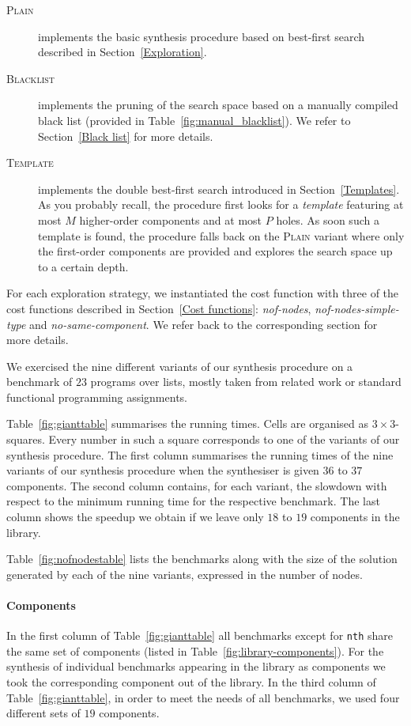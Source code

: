 \begin{description}
\item[\mdseries\textsc{Plain}] implements the basic synthesis procedure based on best-first search described in Section~\ref{Exploration}.
\item[\mdseries\textsc{Blacklist}] implements the pruning of the search space based on a manually compiled black list (provided in Table~\ref{fig:manual_blacklist}). We refer to Section~\ref{Black list} for more details.
\item[\mdseries\textsc{Template}] implements the double best-first search introduced in Section~\ref{Templates}. As you probably recall, the procedure first looks for a \emph{template} featuring at most $M$ higher-order components and at most $P$ holes. As soon such a template is found, the procedure falls back on the \textsc{Plain} variant where only the first-order components are provided and explores the search space up to a certain depth.
\end{description}

For each exploration strategy, we instantiated the cost function with three of the cost functions described in Section~\ref{Cost functions}: \textit{nof-nodes}, \textit{nof-nodes-simple-type} and \textit{no-same-component}. We refer back to the corresponding section for more details.

We exercised the nine different variants of our synthesis procedure on a benchmark of $23$ programs over lists, mostly taken from related work or standard functional programming assignments.

Table~\ref{fig:gianttable} summarises the running times. Cells are organised as $3 \times 3$-squares. Every number in such a square corresponds to one of the variants of our synthesis procedure.
The first column summarises the running times of the nine variants of our synthesis procedure when the synthesiser is given $36$ to $37$ components.
The second column contains, for each variant, the slowdown with respect to the minimum running time for the respective benchmark.
The last column shows the speedup we obtain if we leave only $18$ to $19$ components in the library.

Table~\ref{fig:nofnodestable} lists the benchmarks along with the size of the solution generated by each of the nine variants, expressed in the number of nodes.

\paragraph{Components} In the first column of Table~\ref{fig:gianttable} all benchmarks except for \lstinline?nth? share the same set of components (listed in Table~\ref{fig:library-components}). For the synthesis of individual benchmarks appearing in the library as components we took the corresponding component out of the library.
In the third column of Table~\ref{fig:gianttable}, in order to meet the needs of all benchmarks, we used four different sets of $19$ components.

